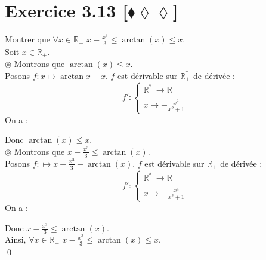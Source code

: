 \documentclass[10pt]{article}
\begin{document}

\section*{Exercice 3.13 [$\blacklozenge\lozenge\lozenge$]}
\begin{tcolorbox}[enhanced, width=6in, center, size=fbox, fontupper=\large, drop shadow southwest]
    Montrer que $\forall{x\in\mathbb{R}_+}$ $x-\frac{x^3}{3}\leq\arctan(x)\leq x$.\\
    Soit $x\in\mathbb{R}_+$.\\[0.25cm]
    $\circledcirc$ Montrons que $\arctan(x)\leq x$.\\
    Posons $f:x\mapsto\arctan{x}-x$. $f$ est dérivable sur $\mathbb{R}^*_+$ de dérivée :
    \begin{equation*}
        f':\begin{cases}\mathbb{R}^*_+\rightarrow\mathbb{R}\\x\mapsto-\frac{x^2}{x^2+1}\end{cases}
    \end{equation*}
    On a :
    \begin{center}
    \end{center}
    Donc $\arctan(x)\leq x$.\\[0.25cm]
    $\circledcirc$ Montrons que $x-\frac{x^3}{3}\leq\arctan(x)$.\\
    Posons $f:\mapsto x-\frac{x^3}{3}-\arctan(x)$. $f$ est dérivable sur $\mathbb{R}_+$ de dérivée :
    \begin{equation*}
        f':\begin{cases}\mathbb{R}^*_+\rightarrow\mathbb{R}\\x\mapsto-\frac{x^4}{x^2+1}\end{cases}
    \end{equation*}
    On a :
    \begin{center}
    \end{center}
    Donc $x-\frac{x^3}{3}\leq \arctan(x)$.\\[0.25cm]
    Ainsi, $\forall{x\in\mathbb{R}_+}$ $x-\frac{x^3}{3}\leq\arctan(x)\leq x$.\\
    \qed
\end{tcolorbox}
\end{document}
